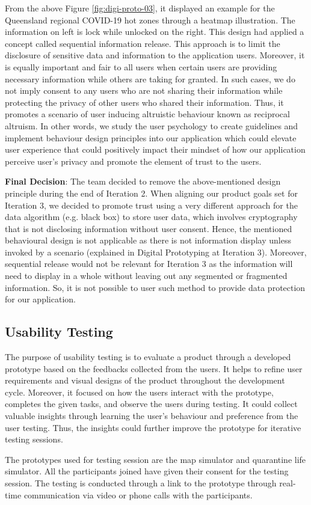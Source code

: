       \par From the above Figure \ref{fig:digi-proto-03}, it displayed an example for the Queensland regional COVID-19 hot zones through a heatmap illustration. The information on left is lock while unlocked on the right. This design had applied a concept called sequential information release. This approach is to limit the disclosure of sensitive data and information to the application users. Moreover, it is equally important and fair to all users when certain users are providing necessary information while others are taking for granted. In such cases, we do not imply consent to any users who are not sharing their information while protecting the privacy of other users who shared their information. Thus, it promotes a scenario of user inducing altruistic behaviour known as reciprocal altruism. In other words, we study the user psychology to create guidelines and implement behaviour design principles into our application which could elevate user experience that could positively impact their mindset of how our application perceive user’s privacy and promote the element of trust to the users.
      \par \textbf{Final Decision}: The team decided to remove the above-mentioned design principle during the end of Iteration 2.
      When aligning our product goals set for Iteration 3, we decided to promote trust using a very different
      approach for the data algorithm (e.g. black box) to store user data, which involves cryptography that
      is not disclosing information without user consent. Hence, the mentioned behavioural design is not
      applicable as there is not information display unless invoked by a scenario (explained in Digital
      Prototyping at Iteration 3). Moreover, sequential release would not be relevant for Iteration 3 as the
      information will need to display in a whole without leaving out any segmented or fragmented
      information. So, it is not possible to user such method to provide data protection for our application.

  \subsection{Usability Testing}
    \par The purpose of usability testing is to evaluate a product through a developed prototype based on the feedbacks collected from the users. It helps to refine user requirements and visual designs of the product throughout the development cycle. Moreover, it focused on how the users interact with the prototype, completes the given tasks, and observe the users during testing. It could collect valuable insights through learning the user’s behaviour and preference from the user testing. Thus, the insights could further improve the prototype for iterative testing sessions.
    \par The prototypes used for testing session are the map simulator and quarantine life simulator. All the participants joined have given their consent for the testing session. The testing is conducted through a link to the prototype through real-time communication via video or phone calls with the participants.
    
